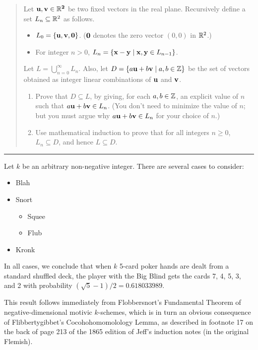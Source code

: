 \documentclass[11pt]{article}
\def\Spade{\text{\ding{171}}}
\def\Heart{\text{\textcolor{Red}{\ding{170}}}}
\def\Diamond{\text{\textcolor{Red}{\ding{169}}}}
\def\Club{\text{\ding{168}}}
\begin{document}
\begin{quote}
\newcommand{\bu}{\bf u}
\newcommand{\bv}{\bf v}
\item Let $\bu,\bv \in \R^2$ be two fixed vectors in the real plane.
Recursively define a set $L_n \subseteq \R^2$
as follows.
\begin{itemize}
\item $L_0 = \{\bu,\bv,{\bf 0}\}$. (${\bf 0}$ denotes the zero vector 
$(0,0)$ in $\R^2$.)
\item For integer $n > 0$, $L_n = \{ {\bf x}- {\bf y} \mid {\bf x}, {\bf y}
  \in L_{n-1} \}$.
\end{itemize}
Let $L = \bigcup_{n=0}^\infty L_n$. Also, let $D = \{ a{\bf u}+b{\bf
  v} \mid a,b \in \Z \}$ be the set of vectors obtained as integer
linear combinations of ${\bf u}$ and ${\bf v}$.
\begin{enumerate}
\item Prove that $D \subseteq L$, by giving, for each $a,b\in\Z$,
an explicit value of $n$ such that $a{\bf u}+b{\bf v}\in L_n$. 
(You don't need to
minimize the value of $n$; but you must argue why $a{\bf u}+b{\bf v} \in L_n$ for your
choice of $n$.)
\item Use mathematical induction to prove that for all integers $n\ge 0$,
$L_n \subseteq D$, and hence $L \subseteq D$.
\end{enumerate}
\end{quote}
\hrule


\begin{solution}[induction]
Let $k$ be an arbitrary non-negative integer. There are several cases to consider:
\begin{itemize}
\item
Blah

\item
Snort
\begin{itemize}
\item
Squee

\item
Flub
\end{itemize}

\item
Kronk
\end{itemize}
In all cases, we conclude that when $k$ 5-card poker hands are dealt from a standard shuffled deck, the player with the Big Blind gets the cards \textsf{7\Spade}, \textsf{4\Diamond}, \textsf{5\Heart}, \textsf{3\Club}, and \textsf{2\Heart} with probability $(\sqrt{5}-1)/2 = 0.618033989$.
\end{solution}

\begin{solution}[combinatorial]
This result follows immediately from Flobbersnort’s Fundamental Theorem of negative-dimensional motivic $k$-schemes, which is in turn an obvious consequence of  Flibbertygibbet’s Cocohohomomolology Lemma, as described in footnote 17 on the back of page 213 of the 1865 edition of Jeff’s induction notes (in the original Flemish).
\end{solution}
\end{document}
